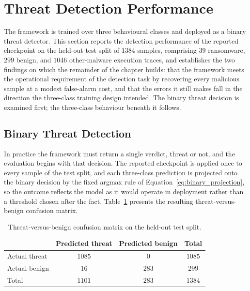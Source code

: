 \documentclass[%
    BCOR=10mm,
    DIV=13,
    toc=bibliography,
    toc=listof,
    oneside,
    12pt,
]{scrbook}
\begin{document}
\section{Threat Detection Performance}
\label{sec:main_results}

The framework is trained over three behavioural classes and deployed as a binary
threat detector. This section reports the detection performance of the reported
checkpoint on the held-out test split of $1384$ samples, comprising $39$
ransomware, $299$ benign, and $1046$ other-malware execution traces, and
establishes the two findings on which the remainder of the chapter builds: that
the framework meets the operational requirement of the detection task by
recovering every malicious sample at a modest false-alarm cost, and that the
errors it still makes fall in the direction the three-class training design
intended. The binary threat decision is examined first; the three-class
behaviour beneath it follows.

\subsection{Binary Threat Detection}
\label{subsec:binary_detection}

In practice the framework must return a single verdict, threat or not, and the
evaluation begins with that decision. The reported
checkpoint is applied once to every sample of the test split, and each
three-class prediction is projected onto the binary decision by the fixed
argmax rule of Equation~\ref{eq:binary_projection}, so the outcome reflects the
model as it would operate in deployment rather than a threshold chosen after
the fact. Table~\ref{tab:binary_confusion} presents the resulting
threat-versus-benign confusion matrix.

\begin{table}[H]
\centering
\small
\caption{Threat-versus-benign confusion matrix on the held-out test split.}
\label{tab:binary_confusion}
\begin{tabular}{l cc c}
\toprule
 & \textbf{Predicted threat} & \textbf{Predicted benign} & \textbf{Total} \\
\midrule
Actual threat & $1085$ & $0$   & $1085$ \\
Actual benign & $16$   & $283$ & $299$  \\
\midrule
Total         & $1101$ & $283$ & $1384$ \\
\bottomrule
\end{tabular}
\end{table}
\end{document}
